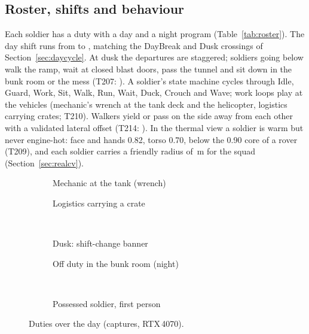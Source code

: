 \subsection{Roster, shifts and behaviour}
Each soldier has a duty with a day and a night program (Table~\ref{tab:roster}). The day shift runs from \shiftStart{} to \shiftEnd, matching the DayBreak and Dusk crossings of Section~\ref{sec:daycycle}. At dusk the departures are staggered; soldiers going below walk the ramp, wait at closed blast doors, pass the tunnel and sit down in the bunk room or the mess (T207: ). A soldier's state machine cycles through Idle, Guard, Work, Sit, Walk, Run, Wait, Duck, Crouch and Wave; work loops play at the vehicles (mechanic's wrench at the tank deck and the helicopter, logistics carrying crates; T210). Walkers yield or pass on the side away from each other with a validated lateral offset (T214: ). In the thermal view a soldier is warm but never engine-hot: face and hands 0.82, torso 0.70, below the 0.90 core of a rover (T209), and each soldier carries a friendly radius of \soldierFriendly\,m for the squad (Section~\ref{sec:realcv}).
\begin{table}[h]
\centering\scriptsize
\caption{Duty roster (generated from ).}\label{tab:roster}
\tabRoster
\end{table}
\begin{figure}[h]
\centering
\begin{subfigure}{0.495\linewidth}\caption{Mechanic at the tank (wrench)}\end{subfigure}
\begin{subfigure}{0.495\linewidth}\caption{Logistics carrying a crate}\end{subfigure}\\[1mm]
\begin{subfigure}{0.495\linewidth}\caption{Dusk: shift-change banner}\end{subfigure}
\begin{subfigure}{0.495\linewidth}\caption{Off duty in the bunk room (night)}\end{subfigure}\\[1mm]
\begin{subfigure}{0.495\linewidth}\caption{Possessed soldier, first person}\end{subfigure}
\caption{Duties over the day (captures, RTX\,4070).}\label{fig:duties}
\end{figure}
